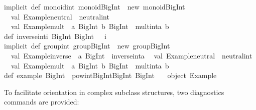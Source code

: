 \begin{isabellebody}
\begin{isamarkuptext}
{\isacharbraceright}\isanewline
\isanewline
implicit\ def\ monoid{\isacharunderscore}int{\isacharcolon}\ monoid{\isacharbrackleft}BigInt{\isacharbrackright}\ {\isacharequal}\ new\ monoid{\isacharbrackleft}BigInt{\isacharbrackright}\ {\isacharbraceleft}\isanewline
\ \ val\ {\isacharbackquote}Example{\isachardot}neutral{\isacharbackquote}\ {\isacharequal}\ neutral{\isacharunderscore}int\isanewline
\ \ val\ {\isacharbackquote}Example{\isachardot}mult{\isacharbackquote}\ {\isacharequal}\ {\isacharparenleft}a{\isacharcolon}\ BigInt{\isacharcomma}\ b{\isacharcolon}\ BigInt{\isacharparenright}\ {\isacharequal}{\isachargreater}\ mult{\isacharunderscore}int{\isacharparenleft}a{\isacharcomma}\ b{\isacharparenright}\isanewline
{\isacharbraceright}\isanewline
\isanewline
def\ inverse{\isacharunderscore}int{\isacharparenleft}i{\isacharcolon}\ BigInt{\isacharparenright}{\isacharcolon}\ BigInt\ {\isacharequal}\ {\isacharparenleft}{\isacharminus}\ i{\isacharparenright}\isanewline
\isanewline
implicit\ def\ group{\isacharunderscore}int{\isacharcolon}\ group{\isacharbrackleft}BigInt{\isacharbrackright}\ {\isacharequal}\ new\ group{\isacharbrackleft}BigInt{\isacharbrackright}\ {\isacharbraceleft}\isanewline
\ \ val\ {\isacharbackquote}Example{\isachardot}inverse{\isacharbackquote}\ {\isacharequal}\ {\isacharparenleft}a{\isacharcolon}\ BigInt{\isacharparenright}\ {\isacharequal}{\isachargreater}\ inverse{\isacharunderscore}int{\isacharparenleft}a{\isacharparenright}\isanewline
\ \ val\ {\isacharbackquote}Example{\isachardot}neutral{\isacharbackquote}\ {\isacharequal}\ neutral{\isacharunderscore}int\isanewline
\ \ val\ {\isacharbackquote}Example{\isachardot}mult{\isacharbackquote}\ {\isacharequal}\ {\isacharparenleft}a{\isacharcolon}\ BigInt{\isacharcomma}\ b{\isacharcolon}\ BigInt{\isacharparenright}\ {\isacharequal}{\isachargreater}\ mult{\isacharunderscore}int{\isacharparenleft}a{\isacharcomma}\ b{\isacharparenright}\isanewline
{\isacharbraceright}\isanewline
\isanewline
def\ example{\isacharcolon}\ BigInt\ {\isacharequal}\ pow{\isacharunderscore}int{\isacharbrackleft}BigInt{\isacharbrackright}{\isacharparenleft}BigInt{\isacharparenleft}{}{}{\isacharparenright}{\isacharcomma}\ BigInt{\isacharparenleft}{\isacharminus}\ {}{\isacharparenright}{\isacharparenright}\isanewline
\isanewline
{\isacharbraceright}\ {\isacharslash}{\isacharasterisk}\ object\ Example\ {\isacharasterisk}{\isacharslash}\isanewline%
\end{isamarkuptext}%
\isamarkuptrue%
%
\endisatagtypewriter
{\isafoldtypewriter}%
%
\isadelimtypewriter
%
\endisadelimtypewriter
%
\isamarkuptrue%
%
\begin{isamarkuptext}%
To facilitate orientation in complex subclass structures, two
  diagnostics commands are provided:


\end{isamarkuptext}
\end{isabellebody}
